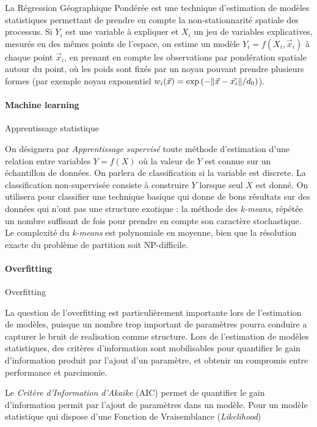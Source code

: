 La Régression Géographique Pondérée est une technique d'estimation de modèles statistiques permettant de prendre en compte la non-stationnarité spatiale des processus. Si $Y_i$ est une variable à expliquer et $X_i$ un jeu de variables explicatives, mesurés en des mêmes points de l'espace, on estime un modèle $Y_i = f(X_i,\vec{x}_i)$ à chaque point $\vec{x}_i$, en prenant en compte les observations par pondération spatiale autour du point, où les poids sont fixés par un noyau pouvant prendre plusieurs formes (par exemple noyau exponentiel $w_i(\vec{x}) = \exp\left(- \| \vec{x} - \vec{x_i} \| / d_0\right)$).




\paragraph{Machine learning}{Apprentissage statistique}


On désignera par \emph{Apprentissage supervisé} toute méthode d'estimation d'une relation entre variables $Y=f(X)$ où la valeur de $Y$ est connue sur un échantillon de données. On parlera de classification si la variable est discrete. La classification non-supervisée consiste à construire $Y$ lorsque seul $X$ est donné. On utilisera pour classifier une technique basique qui donne de bons résultats sur des données qui n'ont pas une structure exotique : la méthode des \emph{k-means}, répétée un nombre suffisant de fois pour prendre en compte son caractère stochastique. Le complexité du \emph{k-means} est polynomiale en moyenne, bien que la résolution exacte du problème de partition soit NP-difficile.




\paragraph{Overfitting}{Overfitting}


La question de l'overfitting est particulièrement importante lors de l'estimation de modèles, puisque un nombre trop important de paramètres pourra conduire a capturer le bruit de realisation comme structure. Lors de l'estimation de modèles statistiques, des critères d'information sont mobilisables pour quantifier le gain d'information produit par l'ajout d'un paramètre, et obtenir un compromis entre performance et parcimonie.


Le \emph{Critère d'Information d'Akaike} (AIC) permet de quantifier le gain d'information permit par l'ajout de paramètres dans un modèle. Pour un modèle statistique qui dispose d'une Fonction de Vraisemblance (\emph{Likelihood})




